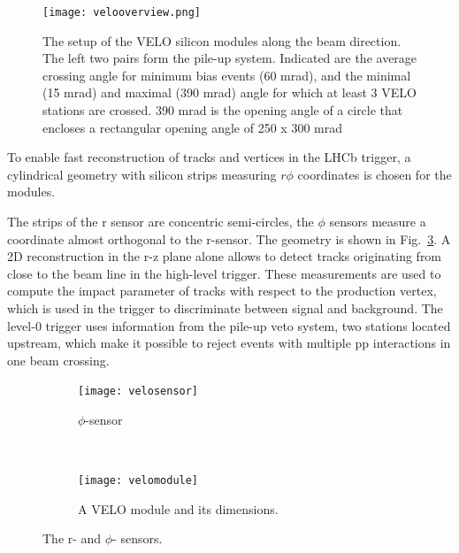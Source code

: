 \begin{figure}[tb]
\begin{center}
\texttt{[image: velooverview.png]}
\end{center}
\caption{\small The setup of the VELO silicon modules along the beam direction.
The left two pairs form the pile-up system. Indicated are the average crossing
angle for minimum bias events (60 mrad), and the minimal (15 mrad) and
maximal (390 mrad) angle for which at least 3 VELO stations are crossed.
390 mrad is the opening angle of a circle that encloses a rectangular opening
angle of 250 x 300 mrad}
\label{fig:velooverview}
\end{figure}

To enable fast reconstruction of tracks and vertices in the LHCb trigger,
a cylindrical geometry with silicon strips measuring $r\phi$ coordinates is
chosen for the modules.

The strips of the r sensor are concentric semi-circles, the $\phi$ sensors 
measure a coordinate almost orthogonal to the r-sensor. The geometry is shown in
Fig.~\ref{fig:velomodule}. A 2D reconstruction in the r-z plane alone allows to
detect tracks originating from close to the beam line in the high-level trigger.
These measurements are used to compute the impact parameter of tracks with
respect to the production vertex, which is used in the trigger to discriminate 
between signal and background. The level-0 trigger uses information from the
pile-up veto system, two stations located upstream, which make it possible to
reject events with multiple pp interactions in one beam crossing.

\begin{figure}
        \centering
        \begin{subfigure}[b]{0.5\textwidth}
            \centering
            \texttt{[image: velosensor]}
            \caption{\velo $\phi$-sensor}
            \label{fig:velosensor}
        \end{subfigure}%
        ~ %
        \begin{subfigure}[b]{0.5\textwidth}
            \centering
            \texttt{[image: velomodule]}
            \caption{A VELO module and its dimensions.}
            \label{fig:velomodule}
        \end{subfigure}
        \caption{The \velo r- and $\phi$- sensors.}\label{fig:veloschema}
\end{figure}



